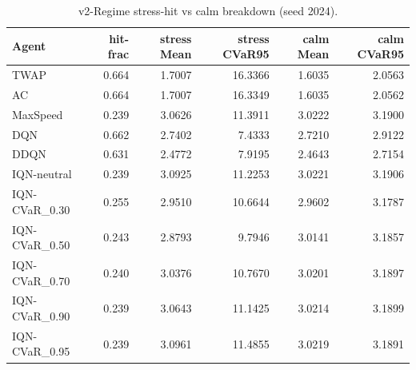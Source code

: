 \begin{table}[H]
    \centering
    \caption{v2-Regime stress-hit vs calm breakdown (seed 2024).}
    \label{tab:v2_regime_breakdown}
    \begin{tabular}{@{}lrrrrr@{}}
        \toprule
        Agent & hit-frac & stress Mean & stress CVaR95 & calm Mean & calm CVaR95 \\
        \midrule
        TWAP & 0.664 & 1.7007 & 16.3366 & 1.6035 & 2.0563 \\
        AC & 0.664 & 1.7007 & 16.3349 & 1.6035 & 2.0562 \\
        MaxSpeed & 0.239 & 3.0626 & 11.3911 & 3.0222 & 3.1900 \\
        DQN & 0.662 & 2.7402 & 7.4333 & 2.7210 & 2.9122 \\
        DDQN & 0.631 & 2.4772 & 7.9195 & 2.4643 & 2.7154 \\
        IQN-neutral & 0.239 & 3.0925 & 11.2253 & 3.0221 & 3.1906 \\
        IQN-CVaR\_0.30 & 0.255 & 2.9510 & 10.6644 & 2.9602 & 3.1787 \\
        IQN-CVaR\_0.50 & 0.243 & 2.8793 & 9.7946 & 3.0141 & 3.1857 \\
        IQN-CVaR\_0.70 & 0.240 & 3.0376 & 10.7670 & 3.0201 & 3.1897 \\
        IQN-CVaR\_0.90 & 0.239 & 3.0643 & 11.1425 & 3.0214 & 3.1899 \\
        IQN-CVaR\_0.95 & 0.239 & 3.0961 & 11.4855 & 3.0219 & 3.1891 \\
        \bottomrule
    \end{tabular}
\end{table}
